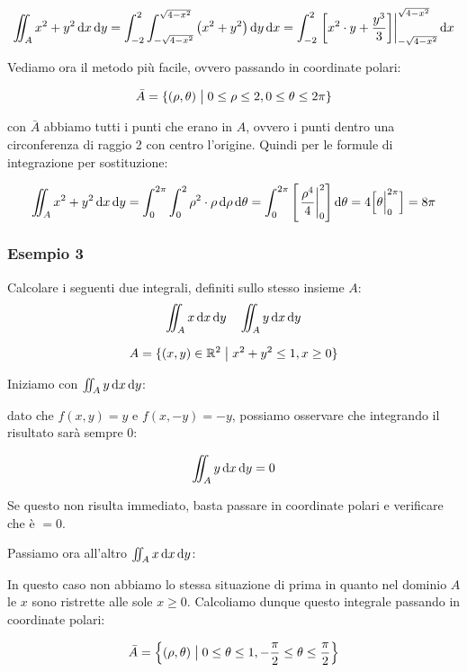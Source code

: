 \[
    \iint_A {x^{2}+y^{2}} \mathop{}\!\mathrm{d}{x}\mathop{}\!\mathrm{d}{y} = \int_{-2}^{2} \int_{-\sqrt{4-x^{2}}}^{\sqrt{4-x^{2}}} {\left(x^{2} + y^{2}\right)} \mathop{}\!\mathrm{d}{y}\mathop{}\!\mathrm{d}{x}  = \int_{-2}^{2} { \left.\left[ x^{2} \cdot y + \frac{y^{3}}{3} \right]\right\rvert_{-\sqrt{4-x^{2}}}^{\sqrt{4-x^{2}}} \mathop{}\!\mathrm{d}{x}}
\]

Vediamo ora il metodo più facile, ovvero passando in coordinate polari:

\[
    \bar{A}  = \{(\rho,\theta) \;\big|\; 0 \le \rho \le 2, 0 \le \theta \le 2\pi \}
\]

con \(\bar{A}\) abbiamo tutti i punti che erano in \(A\), ovvero i punti dentro una circonferenza di raggio 2 con centro l'origine. Quindi per le formule di integrazione per sostituzione:

\[
    \iint_A x^{2}+y^{2} \mathop{}\!\mathrm{d}{x}\mathop{}\!\mathrm{d}{y} = \int_{0}^{2\pi} \int_{0}^{2} \rho^{2}\cdot\rho \mathop{}\!\mathrm{d}{\rho}\mathop{}\!\mathrm{d}{\theta} = \int_{0}^{2\pi} \left[ \left.\frac{\rho^4}{4}\right\rvert_{0}^{2} \right] \mathop{}\!\mathrm{d}{\theta} = 4 \Big[\theta\Big|_{0}^{2\pi}\Big] = 8\pi
\]

\pagebreak
\subsubsection*{Esempio 3}

Calcolare i seguenti due integrali, definiti sullo stesso insieme \(A\):
\[
    \iint_A x \mathop{}\!\mathrm{d}{x}\mathop{}\!\mathrm{d}{y} \quad \iint_A y \mathop{}\!\mathrm{d}{x}\mathop{}\!\mathrm{d}{y}
\]

\[
    A = \{ (x,y) \in \mathbb{R}^2 \;\big|\; x^{2}+y^{2} \le 1, x \ge 0 \}
\]

Iniziamo con \(\iint_A y \mathop{}\!\mathrm{d}{x}\mathop{}\!\mathrm{d}{y}\):

dato che \(f(x,y) = y\) e \(f(x,-y) = -y\), possiamo osservare che integrando il risultato sarà sempre 0:

\[
    \iint_A y \mathop{}\!\mathrm{d}{x}\mathop{}\!\mathrm{d}{y} = 0
\]

Se questo non risulta immediato, basta passare in coordinate polari e verificare che è \(=0\).

Passiamo ora all'altro \(\iint_A x \mathop{}\!\mathrm{d}{x}\mathop{}\!\mathrm{d}{y}\):

In questo caso non abbiamo lo stessa situazione di prima in quanto nel dominio \(A\) le \(x\) sono ristrette alle sole \(x \ge 0\). Calcoliamo dunque questo integrale passando in coordinate polari:

\[
    \bar{A} = \left\{ (\rho,\theta) \;\big|\; 0 \le \theta \le 1, - \frac{\pi}{2} \le \theta \le \frac{\pi}{2} \right\}
\]

